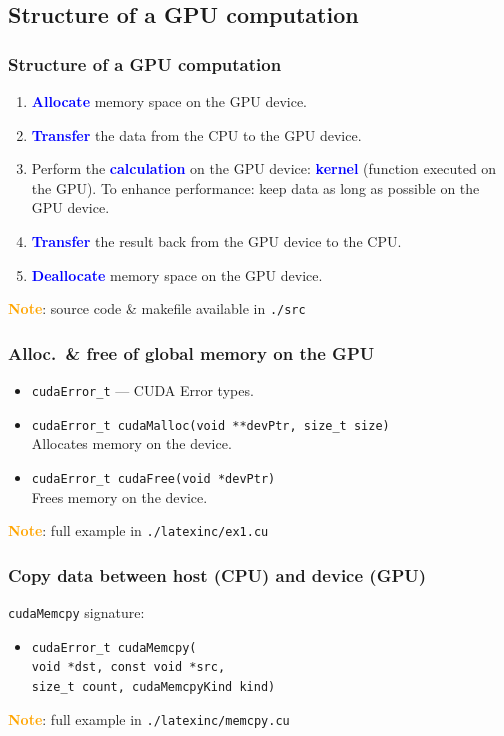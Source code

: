 \subsection{Structure of a GPU computation}

\begin{frame}
  \frametitle{Structure of a GPU computation}
  \begin{enumerate}
    \item \textbf{\textcolor{blue}{Allocate}} memory space on the GPU device.
    \item \textbf{\textcolor{blue}{Transfer}} the data from the CPU to the GPU device.
    \item Perform the \textbf{\textcolor{blue}{calculation}} on the GPU device:
          \textbf{\textcolor{blue}{kernel}} (function executed on the GPU).
          To enhance performance: keep data as long as possible on the GPU device.
    \item \textbf{\textcolor{blue}{Transfer}} the result back from the GPU device to the CPU.
    \item \textbf{\textcolor{blue}{Deallocate}} memory space on the GPU device.
  \end{enumerate}
  \textbf{\textcolor{orange}{Note}}: source code \& makefile available in \texttt{./src}
\end{frame}

\begin{frame}
  \frametitle{Alloc.\ \& free of global memory on the GPU}
  \begin{itemize}
    \item \texttt{cudaError\_t} --- CUDA Error types.
    \item \texttt{cudaError\_t cudaMalloc(void **devPtr, size\_t size)}\\
          Allocates memory on the device.
    \item \texttt{cudaError\_t cudaFree(void *devPtr)}\\
          Frees memory on the device.
  \end{itemize}
  \textbf{\textcolor{orange}{Note}}: full example in \texttt{./latexinc/ex1.cu}
\end{frame}

\begin{frame}
  \frametitle{Copy data between host (CPU) and device (GPU)}
  \texttt{cudaMemcpy} signature:
  \begin{itemize}
    \item \texttt{cudaError\_t cudaMemcpy(}\\
          \hspace{4ex}\texttt{void *dst, const void *src,}\\
          \hspace{4ex}\texttt{size\_t count, cudaMemcpyKind kind)}
  \end{itemize}
  \textbf{\textcolor{orange}{Note}}: full example in \texttt{./latexinc/memcpy.cu}
\end{frame}

